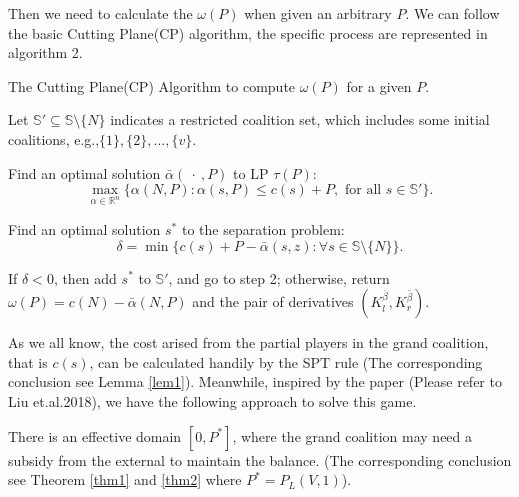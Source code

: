 \documentclass[UTF8]{article}
\begin{document}
Then we need to calculate the $\omega(P)$ when given an arbitrary $P$. We can follow the basic Cutting Plane(CP) algorithm, the specific process are represented in algorithm 2.

\begin{algorithm}[h]\label{algoCP}
\caption{The Cutting Plane(CP) Algorithm to compute $\omega(P)$ for a given $P$.}
\begin{algorithmic}[1]

\begin{description}
  \justifying
  \item[Step 1.] Let $\mathbb{S}'\subseteq \mathbb{S}\setminus \{N\}$ indicates a restricted coalition set, which includes some initial coalitions,
  \vspace{10pt}
  e.g.,$ \{1\},\{2\},\ldots,\{v\}$.
  \item[Step 2.] Find an optimal solution $\bar{\alpha}(\ \cdot \ ,P)$ to LP $\tau(P)$:
  \begin{equation*}
  \max_{\alpha\in \mathbb{R}^n} \big\{ \alpha(N,P): \alpha(s,P) \leq c(s)+P, \mbox{ for all } s \in \mathbb{S}'\big\}.
  \end{equation*}
  \vspace{-11pt}
  \item[Step 3.]
  Find an optimal solution $s^*$ to the separation problem:
  \begin{equation*}
  \delta = \min \big\{ c(s)+ P -\bar{\alpha}(s,z): \forall s \in \mathbb{S} \setminus \{N\}\big\}.
  \end{equation*}
  \item[Step 4.]
  If $\delta<0$, then add $s^*$ to $\mathbb{S}'$, and go to step 2; otherwise, return $\omega(P)=c(N)-\bar{\alpha}(N,P)$ and the pair of derivatives $(K_{l}^{\bar{\beta}},K_{r}^{\bar{\beta}})$.
\end{description}

\end{algorithmic}
\end{algorithm}

As we all know, the cost arised from the partial players in the grand coalition, that is $c(s)$, can be calculated handily by the SPT rule (The corresponding conclusion see Lemma \ref{lem1}). Meanwhile, inspired by the paper (Please refer to Liu et.al.2018), we have the following approach to solve this game.

There is an effective domain $[0, P^*]$, where the grand coalition may need a subsidy from the external to maintain the balance.
(The corresponding conclusion see Theorem \ref{thm1} and \ref{thm2} where $P^* = P_L(V,1)$).
\end{document}
